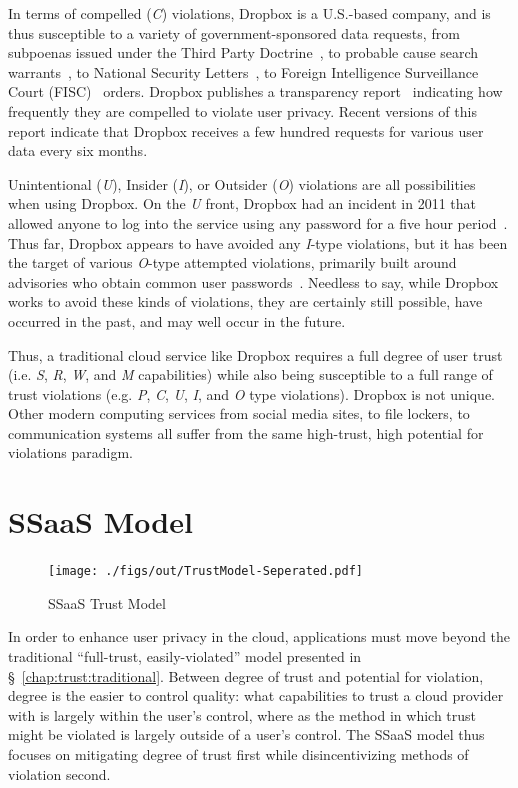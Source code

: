 In terms of compelled (\emph{C}) violations, Dropbox is a U.S.-based
company, and is thus susceptible to a variety of government-sponsored
data requests, from subpoenas issued under the Third Party
Doctrine~\cite{thompson-thirdparty}, to probable cause search
warrants~\cite{us-constitution-amend4}, to National Security
Letters~\cite{fbi-nsl}, to Foreign Intelligence Surveillance Court
(FISC)~\cite{fisc} orders. Dropbox publishes a transparency
report~\cite{dropbox-transparency} indicating how frequently they are
compelled to violate user privacy. Recent versions of this report
indicate that Dropbox receives a few hundred requests for various user
data every six months.

Unintentional (\emph{U}), Insider (\emph{I}), or Outsider (\emph{O})
violations are all possibilities when using Dropbox. On the \emph{U}
front, Dropbox had an incident in 2011 that allowed anyone to log into
the service using any password for a five hour
period~\cite{dropbox-authbug}. Thus far, Dropbox appears to have
avoided any \emph{I}-type violations, but it has been the target of
various \emph{O}-type attempted violations, primarily built around
advisories who obtain common user
passwords~\cite{dropbox-passwords}. Needless to say, while Dropbox
works to avoid these kinds of violations, they are certainly still
possible, have occurred in the past, and may well occur in the future.

Thus, a traditional cloud service like Dropbox requires a full degree
of user trust (i.e. \emph{S}, \emph{R}, \emph{W}, and \emph{M}
capabilities) while also being susceptible to a full range of trust
violations (e.g. \emph{P}, \emph{C}, \emph{U}, \emph{I}, and \emph{O}
type violations). Dropbox is not unique. Other modern computing
services from social media sites, to file lockers, to communication
systems all suffer from the same high-trust, high potential for
violations paradigm.

\section{SSaaS Model}
\label{chap:trust:ssaas}

\begin{figure}[t]
  \centering
  \texttt{[image: ./figs/out/TrustModel-Seperated.pdf]}
  \caption{SSaaS Trust Model}
  \label{fig:trust-ssaas}
\end{figure}

In order to enhance user privacy in the cloud, applications must move
beyond the traditional ``full-trust, easily-violated'' model presented
in \S~\ref{chap:trust:traditional}. Between degree of trust and
potential for violation, degree is the easier to control quality: what
capabilities to trust a cloud provider with is largely within the
user's control, where as the method in which trust might be violated
is largely outside of a user's control. The SSaaS model thus focuses
on mitigating degree of trust first while disincentivizing methods of
violation second.

